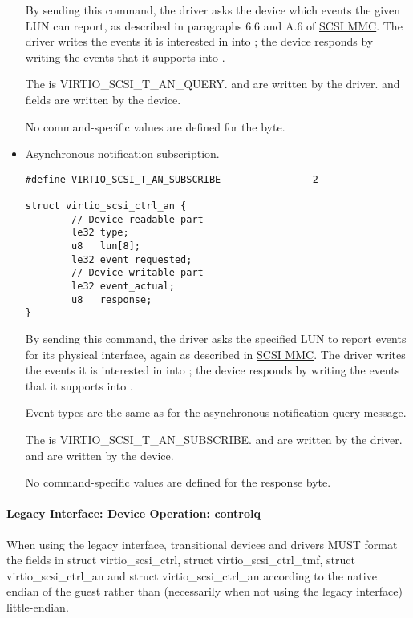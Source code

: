 \begin{itemize}
  By sending this command, the driver asks the device which
  events the given LUN can report, as described in paragraphs 6.6
  and A.6 of \hyperref[intro:SCSI MMC]{SCSI MMC}. The driver writes the
  events it is interested in into ; the device
  responds by writing the events that it supports into
  .

  The  is VIRTIO_SCSI_T_AN_QUERY.  and 
  are written by the driver.  and 
  fields are written by the device.

  No command-specific values are defined for the  byte.

\item Asynchronous notification subscription.
\begin{lstlisting}
#define VIRTIO_SCSI_T_AN_SUBSCRIBE                2

struct virtio_scsi_ctrl_an {
        // Device-readable part
        le32 type;
        u8   lun[8];
        le32 event_requested;
        // Device-writable part
        le32 event_actual;
        u8   response;
}
\end{lstlisting}

  By sending this command, the driver asks the specified LUN to
  report events for its physical interface, again as described in
   \hyperref[intro:SCSI MMC]{SCSI MMC}. The driver writes the events it is
  interested in into ; the device responds by
  writing the events that it supports into .

  Event types are the same as for the asynchronous notification
  query message.

  The  is VIRTIO_SCSI_T_AN_SUBSCRIBE.  and
   are written by the driver.
   and  are written by the device.

  No command-specific values are defined for the response byte.
\end{itemize}

\paragraph{Legacy Interface: Device Operation: controlq}\label{sec:Device Types / SCSI Host Device / Device Operation / Device Operation: controlq / Legacy Interface: Device Operation: controlq}

When using the legacy interface, transitional devices and drivers
MUST format the fields in struct virtio_scsi_ctrl, struct
virtio_scsi_ctrl_tmf, struct virtio_scsi_ctrl_an and struct
virtio_scsi_ctrl_an
according to the native endian of the guest rather than
(necessarily when not using the legacy interface) little-endian.


